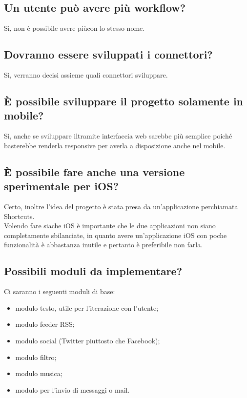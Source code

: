 \documentclass[a4paper,12pt]{article}
\begin{document}
	\subsection{Un utente può avere più workflow?}
	Sì, non è possibile avere piùcon lo stesso nome.

	\subsection{Dovranno essere sviluppati i connettori?}
	Sì, verranno decisi assieme quali connettori sviluppare.

	\subsection{\`{E} possibile sviluppare il progetto solamente in mobile?}
	Sì, anche se sviluppare iltramite interfaccia web sarebbe  più semplice poiché basterebbe renderla responsive per averla a disposizione anche nel mobile.

	\subsection{\`{E} possibile fare anche una versione sperimentale per iOS?}
	Certo, inoltre l'idea del progetto è stata presa da un'applicazione perchiamata Shortcuts. \\
	Volendo fare siache iOS è importante che le due applicazioni non siano completamente sbilanciate, in quanto avere un'applicazione iOS con poche funzionalità è abbastanza inutile e pertanto è preferibile non farla.

	\subsection{Possibili moduli da implementare?}
	Ci saranno i seguenti moduli di base:
	\begin{itemize}
		\item modulo testo, utile per l'iterazione con l'utente;
		\item modulo feeder RSS;
		\item modulo social (Twitter piuttosto che Facebook);
		\item modulo filtro;
		\item modulo musica;
		\item modulo per l'invio di messaggi o mail.
	\end{itemize}
\end{document}
